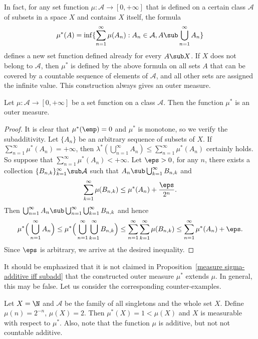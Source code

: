 In fact, for any set function $\mu:\mathcal{A}\to[0,+\infty]$ that is defined on a certain class $\mathcal{A}$ of subsets in a space $X$ and contains $X$ itself, the formula
\begin{align}\label{measure outer construct def}
\mu^*(A)=\inf\{\sum_{n=1}^{\infty}\mu(A_n):A_n\in\mathcal{A},A\sub\bigcup_{n=1}^{\infty}A_n\}
\end{align}
defines a new set function defined already for every $A\sub X$. If $X$ does not belong to $\mathcal{A}$, then $\mu^*$ is defined by the above formula on all sets $A$ that can be covered by a countable sequence of elements of $\mathcal{A}$, and all other sets are assigned the infinite value. This construction always gives an outer measure.
\begin{proposition}\label{measure induced outer measure}
Let $\mu:\mathcal{A}\to[0,+\infty]$ be a set function on a class $\mathcal{A}$. Then the function $\mu^*$ is an outer measure.
\end{proposition}
\begin{proof}
It is clear that $\mu^*(\emp)=0$ and $\mu^*$ is monotone, so we verify the subadditivity. Let $\{A_n\}$ be an arbitrary sequence of subsets of $X$. If $\sum_{n=1}^{\infty}\mu^*(A_n)=+\infty$, then $\lambda^*(\bigcup_{n=1}^{\infty}A_n)\leq\sum_{n=1}^{\infty}\mu^*(A_n)$ certainly holds. So suppose that $\sum_{n=1}^{\infty}\mu^*(A_n)<+\infty$. Let $\eps>0$, for any $n$, there exists a collection $\{B_{n,k}\}_{k=1}^{\infty}\sub\mathcal{A}$ such that $A_n\sub\bigcup_{k=1}^{\infty}B_{n,k}$ and
\[\sum_{k=1}^{\infty}\mu(B_{n,k})\leq\mu^*(A_n)+\frac{\eps}{2^n}.\]
Then $\bigcup_{n=1}^{\infty}A_n\sub\bigcup_{n=1}^{\infty}\bigcup_{k=1}^{\infty}B_{n,k}$ and hence
\[\mu^*\Big(\bigcup_{n=1}^{\infty}A_n\Big)\leq\mu^*\Big(\bigcup_{n=1}^{\infty}\bigcup_{k=1}^{\infty}B_{n,k}\Big)\leq\sum_{n=1}^{\infty}\sum_{k=1}^{\infty}\mu(B_{n,k})\leq\sum_{n=1}^{\infty}\mu^*(A_n)+\eps.\]
Since $\eps$ is arbitrary, we arrive at the desired inequality.
\end{proof}
It should be emphasized that it is not claimed in Proposition~\ref{measure sigma-additive iff subadd} that the constructed outer measure $\mu^*$ extends $\mu$. In general, this may be false. Let us consider the corresponding counter-examples.
\begin{example}
Let $X=\N$ and $\mathcal{A}$ be the family of all singletons and the whole set $X$. Define $\mu(n)=2^{-n}$, $\mu(X)=2$. Then $\mu^*(X)=1<\mu(X)$ and $X$ is measurable with respect to $\mu^*$. Also, note that the function $\mu$ is additive, but not not countable additive.
\end{example}
